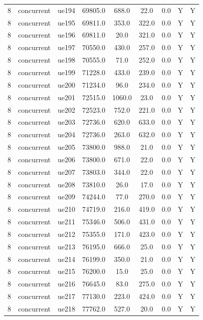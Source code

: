 \begin{table}[ht]
\begin{tabular}{|c|c|c|c|c|c|c|c|c|}
8 & concurrent & ue194 & 69805.0 & 688.0 & 22.0 & 0.0 & Y & Y \\
8 & concurrent & ue195 & 69811.0 & 353.0 & 322.0 & 0.0 & Y & Y \\
8 & concurrent & ue196 & 69811.0 & 20.0 & 321.0 & 0.0 & Y & Y \\
8 & concurrent & ue197 & 70550.0 & 430.0 & 257.0 & 0.0 & Y & Y \\
8 & concurrent & ue198 & 70555.0 & 71.0 & 252.0 & 0.0 & Y & Y \\
8 & concurrent & ue199 & 71228.0 & 433.0 & 239.0 & 0.0 & Y & Y \\
8 & concurrent & ue200 & 71234.0 & 96.0 & 234.0 & 0.0 & Y & Y \\
8 & concurrent & ue201 & 72515.0 & 1060.0 & 23.0 & 0.0 & Y & Y \\
8 & concurrent & ue202 & 72523.0 & 752.0 & 221.0 & 0.0 & Y & Y \\
8 & concurrent & ue203 & 72736.0 & 620.0 & 633.0 & 0.0 & Y & Y \\
8 & concurrent & ue204 & 72736.0 & 263.0 & 632.0 & 0.0 & Y & Y \\
8 & concurrent & ue205 & 73800.0 & 988.0 & 21.0 & 0.0 & Y & Y \\
8 & concurrent & ue206 & 73800.0 & 671.0 & 22.0 & 0.0 & Y & Y \\
8 & concurrent & ue207 & 73803.0 & 344.0 & 22.0 & 0.0 & Y & Y \\
8 & concurrent & ue208 & 73810.0 & 26.0 & 17.0 & 0.0 & Y & Y \\
8 & concurrent & ue209 & 74244.0 & 77.0 & 270.0 & 0.0 & Y & Y \\
8 & concurrent & ue210 & 74719.0 & 216.0 & 419.0 & 0.0 & Y & Y \\
8 & concurrent & ue211 & 75346.0 & 506.0 & 431.0 & 0.0 & Y & Y \\
8 & concurrent & ue212 & 75355.0 & 171.0 & 423.0 & 0.0 & Y & Y \\
8 & concurrent & ue213 & 76195.0 & 666.0 & 25.0 & 0.0 & Y & Y \\
8 & concurrent & ue214 & 76199.0 & 350.0 & 21.0 & 0.0 & Y & Y \\
8 & concurrent & ue215 & 76200.0 & 15.0 & 25.0 & 0.0 & Y & Y \\
8 & concurrent & ue216 & 76645.0 & 83.0 & 275.0 & 0.0 & Y & Y \\
8 & concurrent & ue217 & 77130.0 & 223.0 & 424.0 & 0.0 & Y & Y \\
8 & concurrent & ue218 & 77762.0 & 527.0 & 20.0 & 0.0 & Y & Y \\

\end{tabular}
\end{table}
